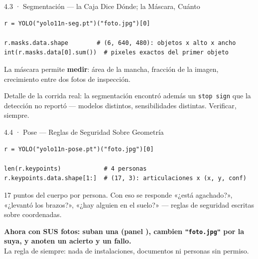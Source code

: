 \documentclass[aspectratio=169, 11pt]{beamer}
\begin{document}
\begin{frame}[fragile, shrink=5]{4.3 · Segmentación --- la Caja Dice Dónde; la Máscara, Cuánto}
  \vspace{2pt}
  \begin{verbatim}
r = YOLO("yolo11n-seg.pt")("foto.jpg")[0]

r.masks.data.shape        # (6, 640, 480): objetos x alto x ancho
int(r.masks.data[0].sum())  # pixeles exactos del primer objeto
  \end{verbatim}
  \vspace{5pt}
  {\footnotesize\color{textMuted}
   La máscara permite \textbf{medir}: área de la mancha, fracción de la
   imagen, crecimiento entre dos fotos de inspección.}
  \vspace{5pt}
  \begin{tcolorbox}[colback=arcaGray, colframe=arcaDark, boxrule=0pt,
    leftrule=3pt, arc=3pt, left=8pt, right=8pt, top=4pt, bottom=4pt]
    {\scriptsize\color{textMuted}
     Detalle de la corrida real: la segmentación encontró además un
     \texttt{stop sign} que la detección no reportó --- modelos distintos,
     sensibilidades distintas. Verificar, siempre.}
  \end{tcolorbox}
\end{frame}

\begin{frame}[fragile, shrink=5]{4.4 · Pose --- Reglas de Seguridad Sobre Geometría}
  \vspace{2pt}
  \begin{verbatim}
r = YOLO("yolo11n-pose.pt")("foto.jpg")[0]

len(r.keypoints)            # 4 personas
r.keypoints.data.shape[1:]  # (17, 3): articulaciones x (x, y, conf)
  \end{verbatim}
  \vspace{5pt}
  {\footnotesize\color{textMuted}
   17 puntos del cuerpo por persona. Con eso se responde «¿está agachado?»,
   «¿levantó los brazos?», «¿hay alguien en el suelo?» --- reglas de
   seguridad escritas sobre coordenadas.}
  \vspace{6pt}
  \begin{tcolorbox}[colback=arcaGray, colframe=codeGreen, boxrule=0pt,
    leftrule=4pt, arc=3pt, left=10pt, right=10pt, top=5pt, bottom=5pt]
    {\footnotesize\color{arcaDark}\bfseries
     Ahora con SUS fotos: suban una (panel \faFolder), cambien
     \texttt{"foto.jpg"} por la suya, y anoten \textbf{un acierto y un
     fallo}.}\\[3pt]
    {\scriptsize\color{textMuted}
     La regla de siempre: nada de instalaciones, documentos ni personas sin
     permiso.}
  \end{tcolorbox}
\end{frame}
\end{document}
